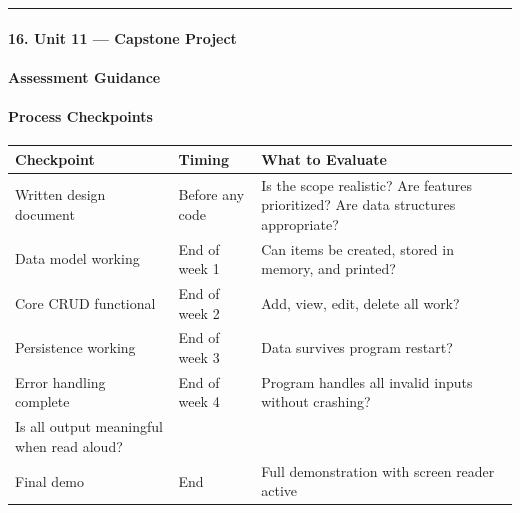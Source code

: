 \documentclass[
  justified,
  openright,
]{tufte-book}
\let\subsection\paragraph
\let\paragraph\paragraph
\let\subsection\paragraph
\let\paragraph\paragraph
\begin{document}
\begin{center}\rule{0.5\linewidth}{0.5pt}\end{center}

\subsection{16. Unit 11 --- Capstone
Project}\label{unit-11-capstone-project}

\subsection{Assessment Guidance}\label{assessment-guidance}

\paragraph{Process Checkpoints}\label{process-checkpoints}

\begin{fullwidth}{\def\LTcaptype{none} %
\begin{longtable}[]{@{}
  >{\raggedright\arraybackslash}p{}
  >{\raggedright\arraybackslash}p{}
  >{\raggedright\arraybackslash}p{}@{}}
\toprule\noalign{}
\begin{minipage}[b]{\linewidth}\raggedright
Checkpoint
\end{minipage} & \begin{minipage}[b]{\linewidth}\raggedright
Timing
\end{minipage} & \begin{minipage}[b]{\linewidth}\raggedright
What to Evaluate
\end{minipage} \\
\midrule\noalign{}
\endhead
\bottomrule\noalign{}
\endlastfoot
Written design document & Before any code & Is the scope realistic? Are
features prioritized? Are data structures appropriate? \\
Data model working & End of week 1 & Can items be created, stored in
memory, and printed? \\
Core CRUD functional & End of week 2 & Add, view, edit, delete all
work? \\
Persistence working & End of week 3 & Data survives program restart? \\
Error handling complete & End of week 4 & Program handles all invalid
inputs without crashing? \\
Is all output meaningful when
read aloud? \\
Final demo & End & Full demonstration with screen reader active \\
\end{longtable}
}
\end{fullwidth}
\end{document}
